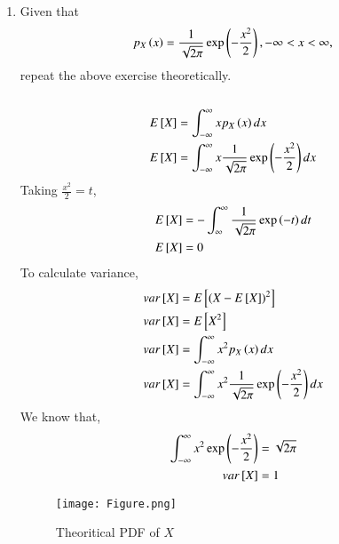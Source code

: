 \documentclass[journal,12pt,twocolumn]{IEEEtran}
\renewcommand\thesection{\arabic{section}}
\begin{document}
\begin{enumerate}[label=\thesection.\arabic*
,ref=\thesection.\theenumi]
\item Given that 
\begin{align}
p_{X}\left(x\right) = \frac{1}{\sqrt{2\pi}}\exp\left(-\frac{x^2}{2}\right), -\infty < x < \infty,
\end{align}
repeat the above exercise theoretically.\\
\solution\\
\begin{align}
    E{}\left[X\right] &= \int_{-\infty}^{\infty}x p_{X}\left(x\right) dx \\
    E{}\left[X\right] &= \int_{-\infty}^{\infty}x
    \frac{1}{\sqrt{2\pi}}\exp\left(-\frac{x^2}{2}\right) dx    
\end{align}
Taking $\frac{x^2}{2} = t$,
\begin{align}
    E{}\left[X\right] &= -\int_{\infty}^{\infty}
    \frac{1}{\sqrt{2\pi}}\exp\left(-t\right) dt\\
    E{}\left[X\right] &= 0
\end{align}
To calculate variance,
\begin{align}
    var{}\left[X\right] &= E{}\left[(X - E{}\left[X\right])^2\right]\\
    var{}\left[X\right] &= E{}\left[X^2\right]\\
    var{}\left[X\right] &= \int_{-\infty}^{\infty}x^2 p_{X}\left(x\right) dx \\
    var{}\left[X\right] &= \int_{-\infty}^{\infty}x^2
    \frac{1}{\sqrt{2\pi}}\exp\left(-\frac{x^2}{2}\right) dx 
\end{align}
We know that,
\begin{align}
    \int_{-\infty}^{\infty}x^2\exp\left(-\frac{x^2}{2}\right) &= \sqrt{2\pi}\\
    var{}\left[X\right] &= 1
\end{align}
\begin{figure}[h!]
    \centering
    \texttt{[image: Figure.png]}
    \caption{Theoritical PDF of $X$}
    \label{fig:my_label}
\end{figure}
\end{enumerate}
\end{document}
